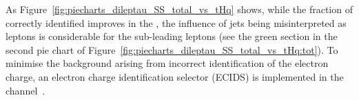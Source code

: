 As Figure~\ref{fig:piecharts_dileptau_SS_total_vs_tHq} shows, while the fraction of correctly identified \tauhad improves in the \dilepSStau,
the influence of jets being misinterpreted as leptons is considerable for the
sub-leading leptons (see the green section in the second pie chart of 
Figure~\ref{fig:piecharts_dileptau_SS_total_vs_tHq:tot}).
To minimise the background arising from incorrect identification of the electron charge, an electron 
charge identification selector (ECIDS) is implemented in the \dilepSStau channel~\cite{ATLAS:2019qmc}.









